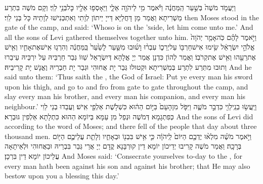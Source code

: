 {וַיַּעֲמֹ֤ד מֹשֶׁה֙ בְּשַׁ֣עַר הַֽמַּחֲנֶ֔ה וַיֹּ֕אמֶר מִ֥י לַיהֹוָ֖ה אֵלָ֑י וַיֵּאָסְפ֥וּ אֵלָ֖יו כׇּל\maqqaf בְּנֵ֥י לֵוִֽי׃}
{וְקָם מֹשֶׁה בִּתְרַע מַשְׁרִיתָא וַאֲמַר מַן דָּחֲלַיָּא דַּייָ יֵיתוֹן לְוָתִי וְאִתְכְּנִישׁוּ לְוָתֵיהּ כָּל בְּנֵי לֵוִי׃}
{then Moses stood in the gate of the camp, and said: ‘Whoso is on the \lord\textsc{’s}\space side, let him come unto me.’ And all the sons of Levi gathered themselves together unto him.}{}
{וַיֹּ֣אמֶר לָהֶ֗ם כֹּֽה\maqqaf אָמַ֤ר יְהֹוָה֙ אֱלֹהֵ֣י יִשְׂרָאֵ֔ל שִׂ֥ימוּ אִישׁ\maqqaf חַרְבּ֖וֹ עַל\maqqaf יְרֵכ֑וֹ עִבְר֨וּ וָשׁ֜וּבוּ מִשַּׁ֤עַר לָשַׁ֙עַר֙ בַּֽמַּחֲנֶ֔ה וְהִרְג֧וּ אִֽישׁ\maqqaf אֶת\maqqaf אָחִ֛יו וְאִ֥ישׁ אֶת\maqqaf רֵעֵ֖הוּ וְאִ֥ישׁ אֶת\maqqaf קְרֹבֽוֹ׃}
{וַאֲמַר לְהוֹן כִּדְנָן אֲמַר יְיָ אֱלָהָא דְּיִשְׂרָאֵל שַׁוּוֹ גְּבַר חַרְבֵּיהּ עַל יִרְכֵּיהּ עֵיבַרוּ וְתוּבוּ מִתְּרַע לִתְרַע בְּמַשְׁרִיתָא וּקְטוּלוּ גְּבַר יָת אֲחוּהִי וּגְבַר יָת חַבְרֵיהּ וֶאֱנָשׁ יָת קָרִיבֵיהּ׃}
{And he said unto them: ‘Thus saith the \lord, the God of Israel: Put ye every man his sword upon his thigh, and go to and fro from gate to gate throughout the camp, and slay every man his brother, and every man his companion, and every man his neighbour.’}{}
{וַיַּֽעֲשׂ֥וּ בְנֵֽי\maqqaf לֵוִ֖י כִּדְבַ֣ר מֹשֶׁ֑ה וַיִּפֹּ֤ל מִן\maqqaf הָעָם֙ בַּיּ֣וֹם הַה֔וּא כִּשְׁלֹ֥שֶׁת אַלְפֵ֖י אִֽישׁ׃}
{וַעֲבַדוּ בְנֵי לֵוִי כְּפִתְגָמָא דְּמֹשֶׁה וּנְפַל מִן עַמָּא בְּיוֹמָא הַהוּא כִּתְלָתָא אַלְפִין גּוּבְרָא׃}
{And the sons of Levi did according to the word of Moses; and there fell of the people that day about three thousand men.}{}
{וַיֹּ֣אמֶר מֹשֶׁ֗ה מִלְא֨וּ יֶדְכֶ֤ם הַיּוֹם֙ לַֽיהֹוָ֔ה כִּ֛י אִ֥ישׁ בִּבְנ֖וֹ וּבְאָחִ֑יו וְלָתֵ֧ת עֲלֵיכֶ֛ם הַיּ֖וֹם בְּרָכָֽה׃}
{וַאֲמַר מֹשֶׁה קָרִיבוּ יְדֵיכוֹן יוֹמָא דֵין קוּרְבָּנָא קֳדָם יְיָ אֲרֵי גְּבַר בִּבְרֵיהּ וּבַאֲחוּהִי וּלְאֵיתָאָה עֲלֵיכוֹן יוֹמָא דֵין בִּרְכָן׃}
{And Moses said: ‘Consecrate yourselves to-day to the \lord, for every man hath been against his son and against his brother; that He may also bestow upon you a blessing this day.’}{}
